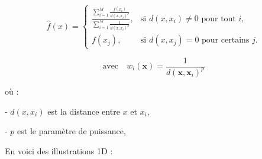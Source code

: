 \begin{equation}
    \hat{f}(x) = 
    \begin{cases}
    \frac{\sum_{i=1}^{M} \frac{f(x_i)}{d(x, x_i)^p}}{\sum_{i=1}^{M} \frac{1}{d(x, x_i)^p}}, & \text{si } d(x, x_i) \neq 0 \text{ pour tout } i, \\ 
    f(x_j), & \text{si } d(x, x_j) = 0 \text{ pour certains } j.
    \end{cases}
\end{equation}


\[
\text{avec} \quad w_i(\mathbf{x}) = \frac{1}{d(\mathbf{x}, \mathbf{x}_i)^p}
\]


où :





- \(d(x, x_i)\) est la distance entre \(x\) et \(x_i\),

\vspace{-0,2 cm}

- \(p\) est le paramètre de puissance,

\vspace{-0,2 cm}




En voici des illustrations 1D :


